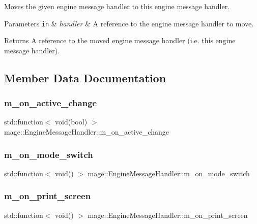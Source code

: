 Moves the given engine message handler to this engine message handler.


\begin{DoxyParams}[1]{Parameters}
\mbox{\tt in}  & {\em handler} & A reference to the engine message handler to move. \\
\hline
\end{DoxyParams}
\begin{DoxyReturn}{Returns}
A reference to the moved engine message handler (i.\+e. this engine message handler). 
\end{DoxyReturn}


\subsection{Member Data Documentation}
\hypertarget{classmage_1_1_engine_message_handler_a16317d998acb4511b1028b8e6e88027b}{}\label{classmage_1_1_engine_message_handler_a16317d998acb4511b1028b8e6e88027b} 
\subsubsection{\texorpdfstring{m\+\_\+on\+\_\+active\+\_\+change}{m\_on\_active\_change}}
{\footnotesize\ttfamily std\+::function$<$ void(bool) $>$ mage\+::\+Engine\+Message\+Handler\+::m\+\_\+on\+\_\+active\+\_\+change}

\hypertarget{classmage_1_1_engine_message_handler_ab1b4379bdda3e37fa2e71e482ae7904a}{}\label{classmage_1_1_engine_message_handler_ab1b4379bdda3e37fa2e71e482ae7904a} 
\subsubsection{\texorpdfstring{m\+\_\+on\+\_\+mode\+\_\+switch}{m\_on\_mode\_switch}}
{\footnotesize\ttfamily std\+::function$<$ void() $>$ mage\+::\+Engine\+Message\+Handler\+::m\+\_\+on\+\_\+mode\+\_\+switch}

\hypertarget{classmage_1_1_engine_message_handler_adbe3af5dfc6ca46e7a41b8261ac82c3f}{}\label{classmage_1_1_engine_message_handler_adbe3af5dfc6ca46e7a41b8261ac82c3f} 
\subsubsection{\texorpdfstring{m\+\_\+on\+\_\+print\+\_\+screen}{m\_on\_print\_screen}}
{\footnotesize\ttfamily std\+::function$<$ void() $>$ mage\+::\+Engine\+Message\+Handler\+::m\+\_\+on\+\_\+print\+\_\+screen}

